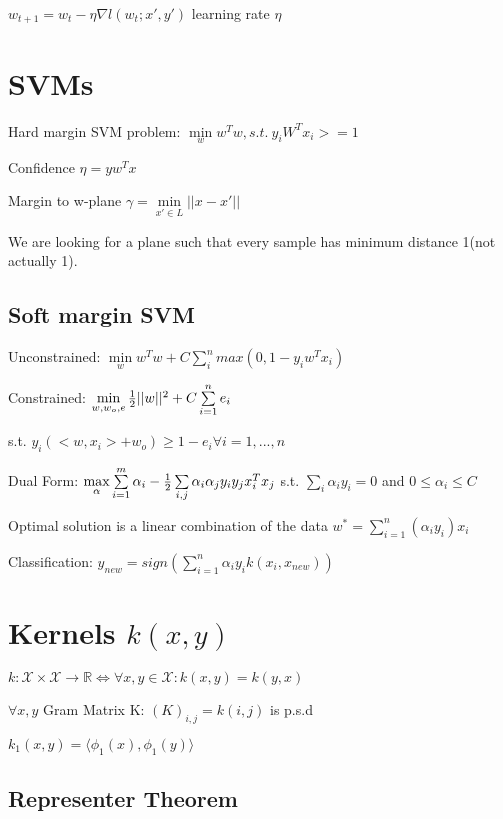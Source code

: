 \documentclass[11pt,twocolumn]{article}
\begin{document}
$w_{t+1} = w_{t} - \eta \nabla l(w_t;x', y') $  learning rate $\eta$



\section{SVMs}
Hard margin SVM problem: $\min \limits_w w^Tw , s.t.~ y_i W^T x_i >= 1$



Confidence $\eta = y w^T x$

Margin to w-plane $\gamma = \min \limits_{x' \in L} ||x-x'|| $

We are looking for a plane such that every sample has minimum distance 1(not actually 1).


\subsection{Soft margin SVM}

Unconstrained: $\min \limits_w w^Tw + C \sum \limits_i^n max\left(0, 1-y_iw^Tx_i\right)$


Constrained: $\min \limits_{w,w_o, e} {{1 \over 2} ||w||^2 + C \sum \limits_{i=1}^n {e_i}}$ 

s.t. $ y_i \left( <w, x_i> + w_o \right) \geq 1 - e_i \forall i = 1,...,n$


Dual Form: $ \max \limits_{\alpha} \sum \limits_{i=1}^m \alpha_i - {1 \over 2} \sum \limits_{i,j} \alpha_i \alpha_j y_i y_j x_i^T x_j$ s.t. $\sum \limits_i \alpha_i y_i  = 0$ and $0 \leq \alpha_i \leq C$


Optimal solution is a linear combination of the data $w^* = \sum \limits_{i=1}^n \left( \alpha_i y_i \right) x_i$

Classification: $y_{new} = sign(  \sum \limits_{i=1}^n \alpha_i y_i  k(x_i, x_{new})  )$

\section{Kernels $k(x,y)$}

$k: \mathcal{X} \times \mathcal{X} \rightarrow \mathbb{R}  \Leftrightarrow \forall x,y \in \mathcal{X} : k\left( x , y \right) = k \left(y,x\right)$

$\forall x, y$
Gram Matrix K: $(K)_{i,j} = k(i,j)$ is p.s.d

$k_1(x,y) = \langle \phi_1(x), \phi_1(y) \rangle $

\subsection{Representer Theorem}
\end{document}

